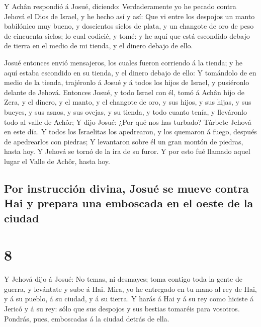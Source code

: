  Y Achân respondió á Josué, diciendo: Verdaderamente yo
he pecado contra Jehová el Dios de Israel, y he hecho así y así:
 Que vi entre los despojos un manto babilónico muy bueno,
y doscientos siclos de plata, y un changote de oro de peso de cincuenta
siclos; lo cual codicié, y tomé: y he aquí que está escondido debajo de
tierra en el medio de mi tienda, y el dinero debajo de ello.

 Josué entonces envió mensajeros, los cuales fueron
corriendo á la tienda; y he aquí estaba escondido en su tienda, y el
dinero debajo de ello:  Y tomándolo de en medio de la
tienda, trajéronlo á Josué y á todos los hijos de Israel, y pusiéronlo
delante de Jehová.  Entonces Josué, y todo Israel con él,
tomó á Achân hijo de Zera, y el dinero, y el manto, y el changote de
oro, y sus hijos, y sus hijas, y sus bueyes, y sus asnos, y sus ovejas,
y su tienda, y todo cuanto tenía, y lleváronlo todo al valle de Achôr;
 Y dijo Josué: ¿Por qué nos has turbado? Túrbete Jehová
en este día. Y todos los Israelitas los apedrearon, y los quemaron á
fuego, después de apedrearlos con piedras;  Y levantaron
sobre él un gran montón de piedras, hasta hoy. Y Jehová se tornó de la
ira de su furor. Y por esto fué llamado aquel lugar el Valle de Achôr,
hasta hoy.

\hypertarget{por-instrucciuxf3n-divina-josuuxe9-se-mueve-contra-hai-y-prepara-una-emboscada-en-el-oeste-de-la-ciudad}{%
\subsection{Por instrucción divina, Josué se mueve contra Hai y prepara
una emboscada en el oeste de la
ciudad}\label{por-instrucciuxf3n-divina-josuuxe9-se-mueve-contra-hai-y-prepara-una-emboscada-en-el-oeste-de-la-ciudad}}

\hypertarget{section-06-8}{%
\section{8}\label{section-06-8}}

 Y Jehová dijo á Josué: No temas, ni desmayes; toma
contigo toda la gente de guerra, y levántate y sube á Hai. Mira, yo he
entregado en tu mano al rey de Hai, y á su pueblo, á su ciudad, y á su
tierra.  Y harás á Hai y á su rey como hiciste á Jericó y
á su rey: sólo que sus despojos y sus bestias tomaréis para vosotros.
Pondrás, pues, emboscadas á la ciudad detrás de ella.

